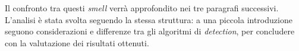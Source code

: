Il confronto tra questi \textit{smell} verrà approfondito nei tre paragrafi successivi. L'analisi è stata svolta seguendo la stessa struttura: a una piccola introduzione seguono considerazioni e differenze tra gli algoritmi di \textit{detection}, per concludere con la valutazione dei risultati ottenuti.









